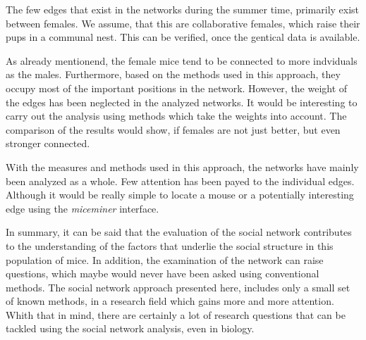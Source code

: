 The few edges that exist in the networks during the summer time, primarily exist between females. We assume, that this are collaborative females, which raise their pups in a communal nest. This can be verified, once the gentical data is available.

As already mentionend, the female mice tend to be connected to more indviduals as the males. Furthermore, based on the methods used in this approach, they occupy most of the important positions in the network. However, the weight of the edges has been neglected in the analyzed networks. It would be interesting to carry out the analysis using methods which take the weights into account. The comparison of the results would show, if females are not just better, but even stronger connected.

With the measures and methods used in this approach, the networks have mainly been analyzed as a whole. Few attention has been payed to the individual edges. Although it would be really simple to locate a mouse or a potentially interesting edge using the \textit{miceminer} interface.

In summary, it can be said that the evaluation of the social network contributes to the understanding of the factors that underlie the social structure in this population of mice. In addition, the examination of the network can raise questions, which maybe would never have been asked using conventional methods. The social network approach presented here, includes only a small set of known methods, in a research field which gains more and more attention. Whith that in mind, there are certainly a lot of research questions that can be tackled using the social network analysis, even in biology.
   




